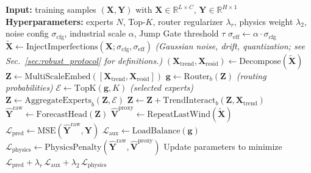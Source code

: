 ﻿\documentclass[review,1p,times]{elsarticle}
\begin{document}
\begin{algorithm}[t]
\caption{Ultra-LSNT training workflow with SCADA imperfection injection.}
\label{alg:train}
\begin{algorithmic}[1]
\STATE \textbf{Input:} training samples $(\mathbf{X},\mathbf{Y})$ with $\mathbf{X}\in\mathbb{R}^{L\times C}$, $\mathbf{Y}\in\mathbb{R}^{H\times 1}$
\STATE \textbf{Hyperparameters:} experts $N$, Top-$K$, router regularizer $\lambda_r$, physics weight $\lambda_2$, noise config $\sigma_{\mathrm{cfg}}$, industrial scale $\alpha$, Jump Gate threshold $\tau$
\STATE $\sigma_{\mathrm{eff}} \leftarrow \alpha \cdot \sigma_{\mathrm{cfg}}$
\STATE $\tilde{\mathbf{X}} \leftarrow \mathrm{InjectImperfections}(\mathbf{X}; \sigma_{\mathrm{cfg}},\sigma_{\mathrm{eff}})$
\STATE \hspace{1em}\textit{(Gaussian noise, drift, quantization; see Sec.~\ref{sec:robust_protocol} for definitions.)}
\STATE $(\mathbf{X}_{\mathrm{trend}},\mathbf{X}_{\mathrm{resid}}) \leftarrow \mathrm{Decompose}(\tilde{\mathbf{X}})$
\STATE $\mathbf{Z} \leftarrow \mathrm{MultiScaleEmbed}([\mathbf{X}_{\mathrm{trend}},\mathbf{X}_{\mathrm{resid}}])$
 \STATE $\mathbf{g}\leftarrow \mathrm{Router}_b(\mathbf{Z})$ \hspace{1em}\textit{(routing probabilities)}
 \STATE $\mathcal{E}\leftarrow \mathrm{TopK}(\mathbf{g},K)$ \hspace{1em}\textit{(selected experts)}
 \STATE $\mathbf{Z}\leftarrow \mathrm{AggregateExperts}_b(\mathbf{Z},\mathcal{E})$
 \STATE $\mathbf{Z}\leftarrow \mathbf{Z} + \mathrm{TrendInteract}_b(\mathbf{Z},\mathbf{X}_{\mathrm{trend}})$
\ENDFOR
\STATE $\hat{\mathbf{Y}}^{\mathrm{raw}} \leftarrow \mathrm{ForecastHead}(\mathbf{Z})$
\STATE $\hat{\mathbf{V}}^{\mathrm{proxy}} \leftarrow \mathrm{RepeatLastWind}(\tilde{\mathbf{X}})$
\STATE $\mathcal{L}_{\mathrm{pred}} \leftarrow \mathrm{MSE}(\hat{\mathbf{Y}}^{\mathrm{raw}},\mathbf{Y})$
\STATE $\mathcal{L}_{\mathrm{aux}} \leftarrow \mathrm{LoadBalance}(\mathbf{g})$
\STATE $\mathcal{L}_{\mathrm{physics}} \leftarrow \mathrm{PhysicsPenalty}(\hat{\mathbf{Y}}^{\mathrm{raw}},\hat{\mathbf{V}}^{\mathrm{proxy}})$
\STATE Update parameters to minimize $\mathcal{L}_{\mathrm{pred}} + \lambda_r\,\mathcal{L}_{\mathrm{aux}} + \lambda_2\,\mathcal{L}_{\mathrm{physics}}$
\end{algorithmic}
\end{algorithm}
\end{document}
